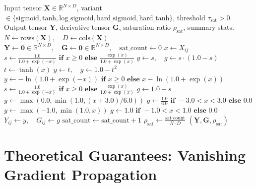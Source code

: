 \documentclass[11pt]{article}
\begin{document}
\begin{algorithm}[H]
\caption{Deterministic Sigmoid/Tanh Activation and Saturation Detection}
\label{alg:sigmoid_tanh}
\begin{algorithmic}[1]
\Require Input tensor $\mathbf{X} \in \mathbb{R}^{N \times D}$, variant $\in \{\text{sigmoid}, \text{tanh}, \text{log\_sigmoid}, \text{hard\_sigmoid}, \text{hard\_tanh}\}$, threshold $\tau_{\text{sat}} > 0$.
\Ensure Output tensor $\mathbf{Y}$, derivative tensor $\mathbf{G}$, saturation ratio $\rho_{\text{sat}}$, summary stats.
\State $N \gets \text{rows}(\mathbf{X}), \quad D \gets \text{cols}(\mathbf{X})$
\State $\mathbf{Y} \gets \mathbf{0} \in \mathbb{R}^{N \times D}, \quad \mathbf{G} \gets \mathbf{0} \in \mathbb{R}^{N \times D}, \quad \text{sat\_count} \gets 0$
        \State $x \gets X_{ij}$
            \State $s \gets \frac{1.0}{1.0 + \exp(-x)} \textbf{ if } x \ge 0 \textbf{ else } \frac{\exp(x)}{1.0 + \exp(x)}$
            \State $y \gets s, \quad g \gets s \cdot (1.0 - s)$
            \State $t \gets \tanh(x)$
            \State $y \gets t, \quad g \gets 1.0 - t^2$
            \State $y \gets -\ln(1.0 + \exp(-x)) \textbf{ if } x \ge 0 \textbf{ else } x - \ln(1.0 + \exp(x))$
            \State $s \gets \frac{1.0}{1.0 + \exp(-x)} \textbf{ if } x \ge 0 \textbf{ else } \frac{\exp(x)}{1.0 + \exp(x)}$
            \State $g \gets 1.0 - s$
            \State $y \gets \max(0.0, \min(1.0, (x + 3.0)/6.0))$
            \State $g \gets \frac{1.0}{6.0} \textbf{ if } -3.0 < x < 3.0 \textbf{ else } 0.0$
            \State $y \gets \max(-1.0, \min(1.0, x))$
            \State $g \gets 1.0 \textbf{ if } -1.0 < x < 1.0 \textbf{ else } 0.0$
        \EndIf
        \State $Y_{ij} \gets y, \quad G_{ij} \gets g$
         $\text{sat\_count} \gets \text{sat\_count} + 1$ \EndIf
    \EndFor
\EndFor
\State $\rho_{\text{sat}} \gets \frac{\text{sat\_count}}{N \cdot D}$
\State \Return $(\mathbf{Y}, \mathbf{G}, \rho_{\text{sat}})$
\end{algorithmic}
\end{algorithm}

\section{Theoretical Guarantees: Vanishing Gradient Propagation}
\label{sec:correctness}
\end{document}
